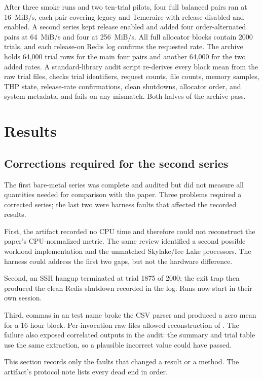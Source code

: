 \documentclass[sigconf]{acmart}
\DeclareRobustCommand{\code}[1]{\path{#1}}
\begin{document}
After three smoke runs and two ten-trial pilots, four full balanced pairs ran
at 16~MiB/s, each pair covering legacy and Temeraire with release disabled and
enabled. A second series kept release enabled and
added four order-alternated pairs at 64~MiB/s and four at 256~MiB/s. All full
allocator blocks contain 2000 trials, and each release-on Redis log confirms the
requested rate. The archive holds 64,000 trial rows for the main four pairs and
another 64,000 for the two added rates. A standard-library audit script
re-derives every block mean from the raw trial files, checks trial identifiers,
request counts, file counts, memory samples, THP state, release-rate
confirmations, clean shutdowns, allocator order, and system metadata, and fails
on any mismatch. Both halves of the archive pass.

\section{Results}
\label{sec:results}

\subsection{Corrections required for the second series}
\label{sec:why-rerun}

The first bare-metal series was complete and audited but did not measure all
quantities needed for comparison with the paper. Three problems required a
corrected series; the last two were harness faults that affected the recorded
results.

First, the artifact recorded no CPU time and therefore could not reconstruct the
paper's CPU-normalized metric. The same review identified a second possible
workload implementation and the unmatched Skylake/Ice Lake processors. The
harness could address the first two gaps, but not the hardware difference.

Second, an SSH hangup terminated \code{redis-benchmark} at trial 1875 of 2000;
the exit trap then produced the clean Redis shutdown recorded in the log. Runs
now start in their own session.

Third, commas in an \code{EVAL} test name broke the CSV parser and produced a
zero mean for a 16-hour block. Per-invocation raw files allowed reconstruction
of \code{trials.csv}. The failure also exposed correlated outputs in the audit:
the summary and trial table use the same extraction, so a plausible incorrect
value could have passed.

This section records only the faults that changed a result or a method. The
artifact's protocol note lists every dead end in order.
\end{document}
